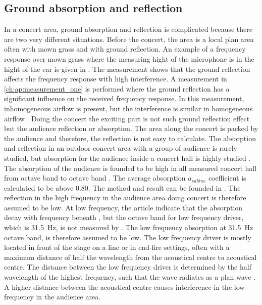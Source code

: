 \subsection{Ground absorption and reflection}\label{ana:ground_ref}
In a concert area, ground absorption and reflection is complicated because there are two very different situations. Before the concert, the area is a local plan area often with mown grass and with ground reflection.  An example of a frequency response over mown grass where the measuring hight of the microphone is in the hight of the ear is given in \citep{review_of_sound}. The measurement shows that the ground reflection affects the frequency response with high interference. 
A measurement in \autoref{ch:ap:measurement_one} is performed where the ground reflection has a significant influence on the received frequency response. In this measurement, inhomogeneous airflow is present, but the interference is similar in homogeneous airflow \citep{review_of_sound}. Doing the concert the exciting part is not such ground reflection effect but the audience reflection or absorption.  The area along the concert is packed by the audience and therefore, the reflection is not easy to calculate. The absorption and reflection in an outdoor concert area with a group of audience is rarely studied, but absorption for the audience inside a concert hall is highly studied \citep{audience_abso}. The absorption of the audience is founded to be high in all measured concert hall from  octave band to  octave band \citep{audience_abso}. The average absorption $a_{sabine}$ coefficient is calculated to be above 0.80. The method and result can be founded in \citep{audience_abso}. The reflection in the high frequency in the audience area doing concert is therefore assumed to be low. At low frequency, the article \citep{audience_abso} indicate that the absorption decay with frequency beneath  , but the octave band for low frequency driver, which is \SI{31.5}{\hertz}, is not measured by \citep{audience_abso}. The low frequency absorption at \SI{31.5}{\hertz} octave band, is therefore assumed to be low. The low frequency driver is mostly located in front of the stage on a line or in end-fire settings, often with a maximum distance of half the wavelength from the acoustical centre to acoustical centre. The distance between the low frequency driver is determined by the half wavelength of the highest frequency, such that the wave radiates as a plan wave \citep{bauman2001wavefront}. A higher distance between the acoustical centre causes interference in the low frequency in the audience area. 



